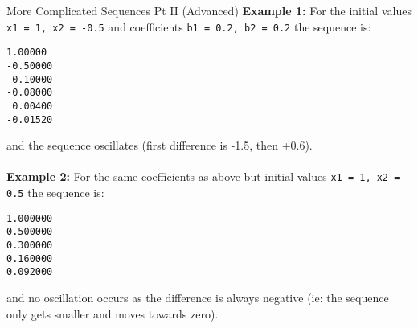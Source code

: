 \documentclass{lab}
\begin{document}
\begin{task}{More Complicated Sequences Pt II (Advanced)}{}
\textbf{Example 1:} For the initial values \texttt{x1 = 1, x2 = -0.5} and coefficients \texttt{b1 = 0.2, b2 = 0.2} the sequence is:
\begin{lstlisting}[style=pseudo]
 1.00000
-0.50000
 0.10000
-0.08000
 0.00400
-0.01520
\end{lstlisting}
and the sequence oscillates (first difference is -1.5, then +0.6).
\\ \\
\textbf{Example 2:} For the same coefficients as above but initial values \texttt{x1 = 1, x2 = 0.5} the sequence is:
\begin{lstlisting}[style=pseudo]
1.000000
0.500000
0.300000
0.160000
0.092000
\end{lstlisting}
and no oscillation occurs as the difference is always negative (ie: the sequence only gets smaller and moves towards zero).
\end{task}
\end{document}
